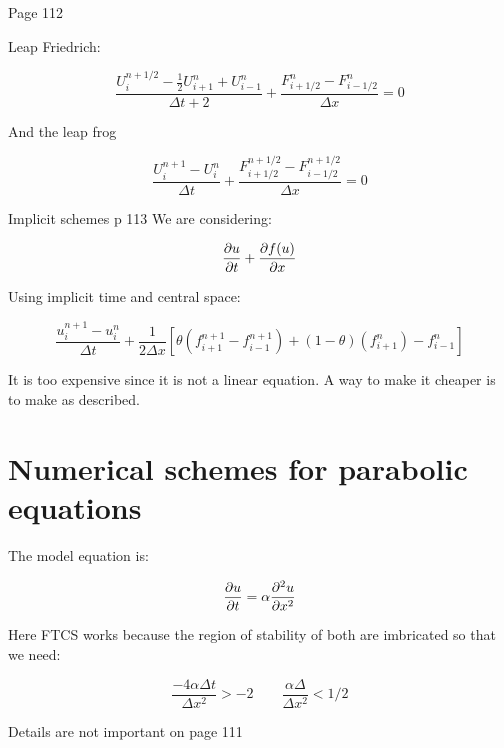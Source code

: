 Page 112

Leap Friedrich: 

\begin{equation}
\frac{U_i^{n+1/2}-\frac{1}{2}U_{i+1}^n+U_{i-1}^n}{\Delta t+2} + \frac{F_{i+1/2}^n-F^n_{i-1/2}}{\Delta x}=0 
\end{equation}

And the leap frog 

\begin{equation}
\frac{U_i^{n+1}-U_i^n}{\Delta t}+ \frac{F^{n+1/2}_{i+1/2}-F_{i-1/2}^{n+1/2}}{\Delta x} = 0
\end{equation}

Implicit schemes p 113
We are considering: 

\begin{equation}
\frac{\partial u}{\partial t }+ \frac{\partial f(u)}{\partial x} 
\end{equation}

Using implicit time and central space: 

\begin{equation}
\frac{u^{n+1}_i-u_i^n}{\Delta t} + \frac{1}{2\Delta x} [\theta (f_{i+1}^{n+1}-f_{i-1}^{n+1})+(1-\theta) (f_{i+1}^n)-f^n_{i-1}]
\end{equation}

It is too expensive since it is not a linear equation. A way to make it cheaper is to make as described. 

\section{Numerical schemes for parabolic equations}
The model equation is: 

\begin{equation}
\frac{\partial u}{\partial t} = \alpha \frac{\partial ^2 u}{\partial x^2}
\end{equation}

Here FTCS works because the region of stability of both are imbricated so that we need: 

\begin{equation}
\frac{-4\alpha \Delta t}{\Delta x^2} > -2 \qquad \frac{\alpha \Delta }{\Delta x^2}<1/2
\end{equation}

Details are not important on page 111
